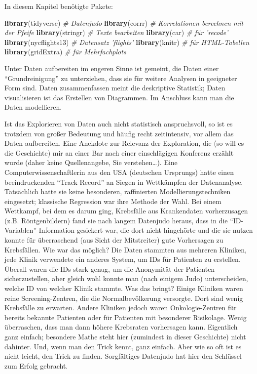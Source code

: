 \documentclass[12pt,]{book}
\newenvironment{Shaded}{\begin{snugshade}}{\end{snugshade}}
\newcommand{\KeywordTok}[1]{\textcolor[rgb]{0.13,0.29,0.53}{\textbf{{#1}}}}
\newcommand{\CommentTok}[1]{\textcolor[rgb]{0.56,0.35,0.01}{\textit{{#1}}}}
\newcommand{\NormalTok}[1]{{#1}}
\begin{document}
In diesem Kapitel benötigte Pakete:

\begin{Shaded}
\begin{Highlighting}[]
\KeywordTok{library}\NormalTok{(tidyverse)  }\CommentTok{# Datenjudo}
\KeywordTok{library}\NormalTok{(corrr)  }\CommentTok{# Korrelationen berechnen mit der Pfeife}
\KeywordTok{library}\NormalTok{(stringr)   }\CommentTok{# Texte bearbeiten}
\KeywordTok{library}\NormalTok{(car)  }\CommentTok{# für 'recode'}
\KeywordTok{library}\NormalTok{(nycflights13)  }\CommentTok{# Datensatz 'flights'}
\KeywordTok{library}\NormalTok{(knitr)  }\CommentTok{# für HTML-Tabellen}
\KeywordTok{library}\NormalTok{(gridExtra)  }\CommentTok{# für Mehrfachplots}
\end{Highlighting}
\end{Shaded}

Unter Daten aufbereiten im engeren Sinne ist gemeint, die Daten einer
``Grundreinigung'' zu unterziehen, dass sie für weitere Analysen in
geeigneter Form sind. Daten zusammenfassen meint die deskriptive
Statistik; Daten visualisieren ist das Erstellen von Diagrammen. Im
Anschluss kann man die Daten modellieren.

Ist das Explorieren von Daten auch nicht statistisch anspruchsvoll, so
ist es trotzdem von großer Bedeutung und häufig recht zeitintensiv, vor
allem das Daten aufbereiten. Eine Anekdote zur Relevanz der Exploration,
die (so will es die Geschichte) mir an einer Bar nach einer
einschlägigen Konferenz erzählt wurde (daher keine Quellenangebe, Sie
verstehen\ldots{}). Eine Computerwissenschaftlerin aus den USA
(deutschen Ursprungs) hatte einen beeindruckenden ``Track Record'' an
Siegen in Wettkämpfen der Datenanalyse. Tatsächlich hatte sie keine
besonderen, raffinierten Modellierungstechniken eingesetzt; klassische
Regression war ihre Methode der Wahl. Bei einem Wettkampf, bei dem es
darum ging, Krebsfälle aus Krankendaten vorherzusagen (z.B.
Röntgenbildern) fand sie nach langem Datenjudo heraus, dass in die
``ID-Variablen'' Information gesickert war, die dort nicht hingehörte
und die sie nutzen konnte für überraschend (aus Sicht der Mitstreiter)
gute Vorhersagen zu Krebsfällen. Wie war das möglich? Die Daten stammten
aus mehreren Kliniken, jede Klinik verwendete ein anderes System, um IDs
für Patienten zu erstellen. Überall waren die IDs stark genug, um die
Anonymität der Patienten sicherzustellen, aber gleich wohl konnte man
(nach einigem Judo) unterscheiden, welche ID von welcher Klinik stammte.
Was das bringt? Einige Kliniken waren reine Screening-Zentren, die die
Normalbevölkerung versorgte. Dort sind wenig Krebsfälle zu erwarten.
Andere Kliniken jedoch waren Onkologie-Zentren für bereits bekannte
Patienten oder für Patienten mit besonderer Risikolage. Wenig
überraschen, dass man dann höhere Krebsraten vorhersagen kann.
Eigentlich ganz einfach; besondere Mathe steht hier (zumindest in dieser
Geschichte) nicht dahinter. Und, wenn man den Trick kennt, ganz einfach.
Aber wie so oft ist es nicht leicht, den Trick zu finden. Sorgfältiges
Datenjudo hat hier den Schlüssel zum Erfolg gebracht.
\end{document}
